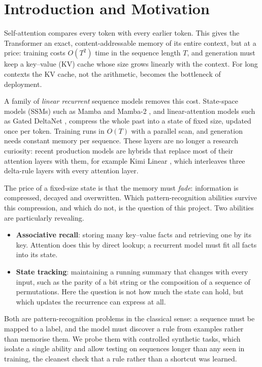 \section{Introduction and Motivation}
\label{sec:intro}

Self-attention \citep{vaswani2017attention} compares every token with every earlier token. This gives the
Transformer an exact, content-addressable memory of its entire context, but at a price: training costs
$O(T^2)$ time in the sequence length $T$, and generation must keep a key--value (KV) cache whose size
grows linearly with the context. For long contexts the KV cache, not the arithmetic, becomes the
bottleneck of deployment.

A family of \emph{linear recurrent} sequence models removes this cost. State-space models (SSMs) such as
Mamba \citep{gu2023mamba} and Mamba-2 \citep{dao2024ssd}, and linear-attention models such as Gated
DeltaNet \citep{yang2025gated}, compress the whole past into a state of fixed size, updated once per token.
Training runs in $O(T)$ with a parallel scan, and generation needs constant memory per sequence. These
layers are no longer a research curiosity: recent production models are hybrids that replace most of
their attention layers with them, for example Kimi Linear \citep{kimi2025linear}, which interleaves three
delta-rule layers with every attention layer.

The price of a fixed-size state is that the memory must \emph{fade}: information is compressed, decayed
and overwritten. Which pattern-recognition abilities survive this compression, and which do not, is the
question of this project. Two abilities are particularly revealing.
\begin{itemize}
  \item \textbf{Associative recall}: storing many key--value facts and retrieving one by its key. Attention
        does this by direct lookup; a recurrent model must fit all facts into its state.
  \item \textbf{State tracking}: maintaining a running summary that changes with every input, such as the
        parity of a bit string or the composition of a sequence of permutations. Here the question is not
        how much the state can hold, but which updates the recurrence can express at all.
\end{itemize}
Both are pattern-recognition problems in the classical sense: a sequence must be mapped to a label, and
the model must discover a rule from examples rather than memorise them. We probe them with controlled
synthetic tasks, which isolate a single ability and allow testing on sequences longer than any seen in
training, the cleanest check that a rule rather than a shortcut was learned.

